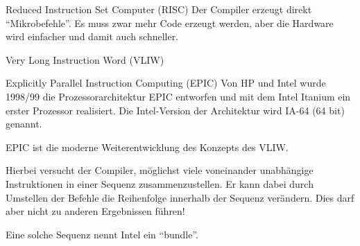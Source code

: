 \begin{defi}{Reduced Instruction Set Computer (RISC)}
    Der Compiler erzeugt direkt \enquote{Mikrobefehle}. 
    Es muss zwar mehr Code erzeugt werden, 
    aber die Hardware wird einfacher und damit auch schneller.
\end{defi}

\begin{defi}{Very Long Instruction Word (VLIW)}
\end{defi}

\begin{defi}{Explicitly Parallel Instruction Computing (EPIC)}
    Von HP und Intel wurde 1998/99 die Prozessorarchitektur EPIC entworfen 
    und mit dem Intel Itanium ein erster Prozessor realisiert. 
    Die Intel-Version der Architektur wird IA-64 (64 bit) genannt.

    EPIC ist die moderne Weiterentwicklung des Konzepts des VLIW.
    
    Hierbei versucht der Compiler, 
    möglichst viele voneinander unabhängige Instruktionen in einer Sequenz zusammenzustellen. 
    Er kann dabei durch Umstellen der Befehle die Reihenfolge innerhalb der Sequenz verändern. 
    Dies darf aber nicht zu anderen Ergebnissen führen!
    
    Eine solche Sequenz nennt Intel ein “bundle”.
\end{defi}